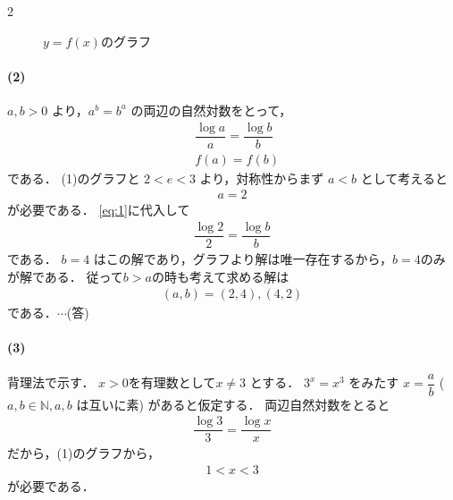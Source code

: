 \documentclass[../../main.tex]{subfiles}
\begin{document}
\begin{multicols}{2}
\begin{figure}[H]
    \caption{$y=f(x)$のグラフ}
    \label{1991-1:fig:1}
  \end{figure}

  \paragraph{(2)}
  $a, b > 0$ より，$a^b = b^a$ の両辺の自然対数をとって，
  \begin{align}
    & \dfrac{\log a}{a} = \dfrac{\log b}{b} \\
    & f(a) = f(b) \label{eq:1}
  \end{align}
  である．
  (1)のグラフと $2 < e < 3$ より，対称性からまず $a < b$ として考えると
  \begin{align}
    a = 2
  \end{align}
  が必要である．
  \cref{eq:1}に代入して
  \begin{align}
    \dfrac{\log 2}{2} = \dfrac{\log b}{b}
  \end{align}
  である．
  $b=4$ はこの解であり，グラフより解は唯一存在するから，$b=4$のみが解である．
  従って$b>a$の時も考えて求める解は
  \begin{align}
    (a,b) = (2,4), (4,2)\label{eq:2}
  \end{align}
  である．$\cdots$(答)

  \paragraph{(3)}
  背理法で示す．
  $x>0$を有理数として$x \neq 3$ とする．
  $3^x = x^3$ をみたす $x = \dfrac{a}{b}$ ($a,b \in \mathbb{N}, a,b$ は互いに素) があると仮定する．
  両辺自然対数をとると
  \begin{align}
    \dfrac{\log 3}{3} = \dfrac{\log x}{x}
  \end{align}
  だから，(1)のグラフから，
  \begin{align}
    1 < x < 3 \label{eq:3}
  \end{align}
  が必要である．


\end{multicols}
\end{document}
